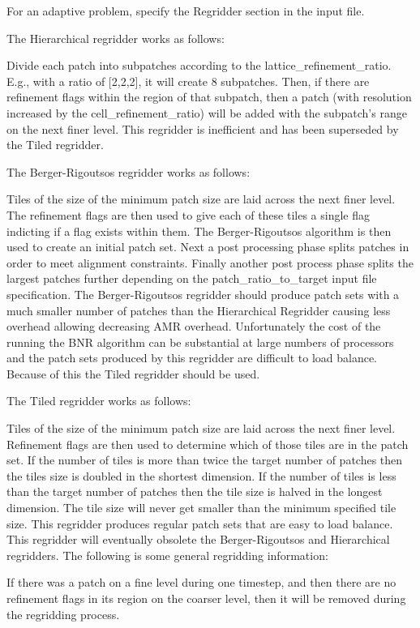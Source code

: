 For an adaptive problem, specify the Regridder section in the input
file.
 
The Hierarchical regridder works as follows: 

Divide each patch into subpatches according to the
lattice\_refinement\_ratio. E.g., with a ratio of [2,2,2], it will
create 8 subpatches. Then, if there are refinement flags within the
region of that subpatch, then a patch (with resolution increased by
the cell\_refinement\_ratio) will be added with the subpatch's range on
the next finer level. This regridder is inefficient and has been
superseded by the Tiled regridder.

The Berger-Rigoutsos regridder works as follows: 

Tiles of the size of the minimum patch size are laid across the next
finer level. The refinement flags are then used to give each of these
tiles a single flag indicting if a flag exists within them. The
Berger-Rigoutsos algorithm is then used to create an initial patch
set. Next a post processing phase splits patches in order to meet
alignment constraints. Finally another post process phase splits the
largest patches further depending on the patch\_ratio\_to\_target input
file specification. The Berger-Rigoutsos regridder should produce
patch sets with a much smaller number of patches than the Hierarchical
Regridder causing less overhead allowing decreasing AMR
overhead. Unfortunately the cost of the running the BNR algorithm can
be substantial at large numbers of processors and the patch sets
produced by this regridder are difficult to load balance. Because of
this the Tiled regridder should be used.

The Tiled regridder works as follows: 

Tiles of the size of the minimum patch size are laid across the next
finer level. Refinement flags are then used to determine which of
those tiles are in the patch set. If the number of tiles is more than
twice the target number of patches then the tiles size is doubled in
the shortest dimension. If the number of tiles is less than the target
number of patches then the tile size is halved in the longest
dimension. The tile size will never get smaller than the minimum
specified tile size. This regridder produces regular patch sets that
are easy to load balance. This regridder will eventually obsolete the
Berger-Rigoutsos and Hierarchical regridders.  The following is some
general regridding information:

If there was a patch on a fine level during one timestep, and then
there are no refinement flags in its region on the coarser level, then
it will be removed during the regridding process.

